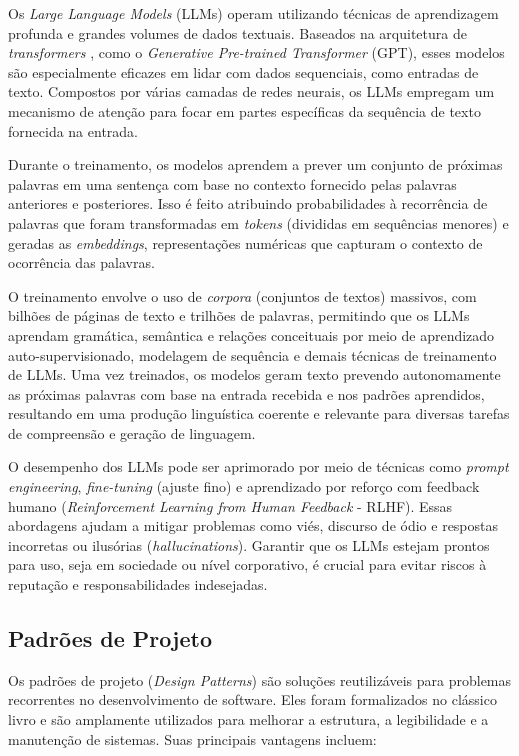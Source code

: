 \documentclass[a4paper, 12pt]{article}
\newcommand{\citeb}[1]{\bibleftbracket\cite{#1}\bibrightbracket}
\begin{document}
    Os \textit{Large Language Models} (LLMs) operam utilizando técnicas de aprendizagem profunda e grandes volumes de dados textuais. Baseados na arquitetura de \textit{transformers} \citeb{att_all_u_need}, como o \textit{Generative Pre-trained Transformer} (GPT), esses modelos são especialmente eficazes em lidar com dados sequenciais, como entradas de texto. Compostos por várias camadas de redes neurais, os LLMs empregam um mecanismo de atenção para focar em partes específicas da sequência de texto fornecida na entrada.

    Durante o treinamento, os modelos aprendem a prever um conjunto de próximas palavras em uma sentença com base no contexto fornecido pelas palavras anteriores e posteriores. Isso é feito atribuindo probabilidades à recorrência de palavras que foram transformadas em \textit{tokens} (divididas em sequências menores) e geradas as \textit{embeddings}, representações numéricas que capturam o contexto de ocorrência das palavras.

    O treinamento envolve o uso de \textit{corpora} (conjuntos de textos) massivos, com bilhões de páginas de texto e trilhões de palavras, permitindo que os LLMs aprendam gramática, semântica e relações conceituais por meio de aprendizado auto-supervisionado, modelagem de sequência e demais técnicas de treinamento de LLMs. Uma vez treinados, os modelos geram texto prevendo autonomamente as próximas palavras com base na entrada recebida e nos padrões aprendidos, resultando em uma produção linguística coerente e relevante para diversas tarefas de compreensão e geração de linguagem.

    O desempenho dos LLMs pode ser aprimorado por meio de técnicas como \textit{prompt engineering}, \textit{fine-tuning} (ajuste fino) e aprendizado por reforço com feedback humano (\textit{Reinforcement Learning from Human Feedback} - RLHF). Essas abordagens ajudam a mitigar problemas como viés, discurso de ódio e respostas incorretas ou ilusórias (\textit{hallucinations}). Garantir que os LLMs estejam prontos para uso, seja em sociedade ou nível corporativo, é crucial para evitar riscos à reputação e responsabilidades indesejadas.
    
    \subsection{Padrões de Projeto} \label{sec:design_pattern}

    Os padrões de projeto (\textit{Design Patterns}) são soluções reutilizáveis para problemas recorrentes no desenvolvimento de software. Eles foram formalizados no clássico livro \citeb{design_patterns} e são amplamente utilizados para melhorar a estrutura, a legibilidade e a manutenção de sistemas. Suas principais vantagens incluem:
    
\end{document}
